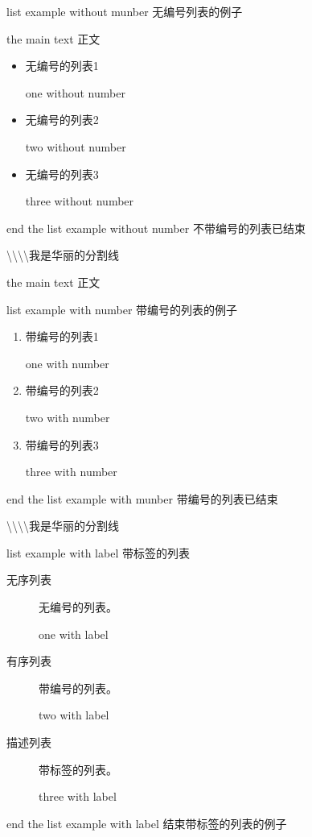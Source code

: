 \documentclass[UTF8]{ctexart}
\begin{document}
list example without munber     无编号列表的例子

the main text    正文

\begin{itemize}
\item 无编号的列表1

one without number

\item 无编号的列表2

two without number

\item 无编号的列表3

three without number

\end{itemize}

end the list example without number  不带编号的列表已结束

\textbackslash \textbackslash \textbackslash \textbackslash 我是华丽的分割线


the main text  正文


list example with number   带编号的列表的例子


\begin{enumerate}
\item 带编号的列表1

one with number

\item 带编号的列表2

two with number

\item 带编号的列表3

three with number

\end{enumerate}


end the list example with munber   带编号的列表已结束

\textbackslash \textbackslash \textbackslash \textbackslash 我是华丽的分割线

list example with label        带标签的列表     

\begin{description}
\item[无序列表] 无编号的列表。

one with label

\item[有序列表] 带编号的列表。

two with label

\item[描述列表] 带标签的列表。

three with label

\end{description}

end the list example with label     结束带标签的列表的例子
\end{document}
